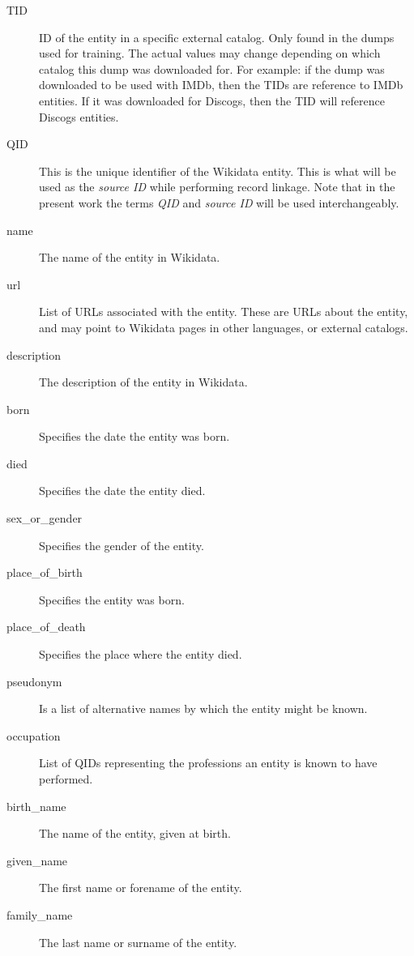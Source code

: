 \documentclass[epsfig,a4paper,11pt,titlepage,twoside,openany]{book}
\begin{document}
\begin{description}

\item[TID] ID of the entity in a specific external catalog. Only found in the dumps used for training. The actual values may change depending on which catalog this dump was downloaded for. For example: if the dump was downloaded to be used with IMDb, then the TIDs are reference to IMDb entities. If it was downloaded for Discogs, then the TID will reference Discogs entities. 

\item[QID] This is the unique identifier of the Wikidata entity. This is what will be used as the \textit{source ID} while performing record linkage. Note that in the present work the terms \textit{QID} and \textit{source ID} will be used interchangeably.

\item[name] The name of the entity in Wikidata.

\item[url] List of URLs associated with the entity. These are URLs about the entity, and may point to Wikidata pages in other languages, or external catalogs.

\item[description] The description of the entity in Wikidata.

\item[born] Specifies the date the entity was born.

\item[died] Specifies the date the entity died.

\item[sex\_or\_gender] Specifies the gender of the entity.

\item[place\_of\_birth] Specifies the entity was born.

\item[place\_of\_death] Specifies the place where the entity died.

\item[pseudonym] Is a list of alternative names by which the entity might be known.

\item[occupation] List of QIDs representing the professions an entity is known to have performed.

\item[birth\_name] The name of the entity, given at birth.

\item[given\_name] The first name or forename of the entity.

\item[family\_name] The last name or surname of the entity.
\end{description}
\end{document}
